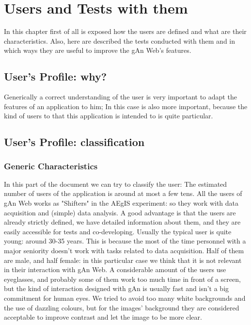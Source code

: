 
\chapter{Users and Tests with them} %

\label{Chapter6} %

In this chapter first of all is exposed how the users are defined and what are their characteristics. Also, here are described the tests conducted with them and in which ways they are useful to improve the gAn Web's features.   

\section{User's Profile: why?}

Generically a correct understanding of the user is very important to adapt the features of an application to him; In this case is also more important, because the kind of users to that this application is intended to is quite particular.


\section{User's Profile: classification}

\subsection{Generic Characteristics}
In this part of the document we can try to classify the user:
The estimated number of users of the application is around at most a few tens.
All the users of gAn Web works as "Shifters" in the AEgIS experiment: so they work with data acquisition and (simple) data analysis.
A good advantage is that the users are already strictly defined, we have detailed information about them, and they are easily accessible for tests and co-developing.
Usually the typical user is quite young: around 30-35 years. This is because the most of the time personnel with a major seniority doesn't work with tasks related to data acquisition. 
Half of them are male, and half female: in this particular case we think that it is not relevant in their interaction with gAn Web.
A considerable amount of the users use eyeglasses, and probably some of them work too much time in front of a screen, but the kind of interaction designed with gAn is usually fast and isn't a big commitment for human eyes. We tried to avoid too many white backgrounds and the use of dazzling colours, but for the images' background they are considered acceptable to improve contrast and let the image to be more clear.  

